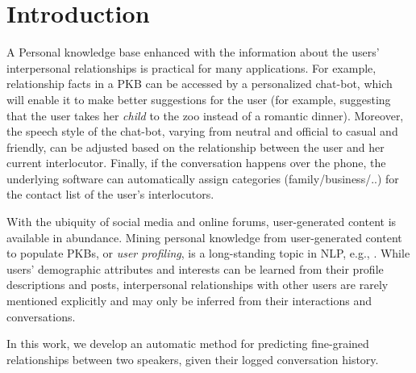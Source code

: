 \section{Introduction}

 A Personal knowledge base enhanced with the information about the users' interpersonal relationships is practical for many applications. For example, relationship facts in a PKB can be accessed by a personalized chat-bot, which will enable it to make better suggestions for the user (for example, suggesting that the user takes her \textit{child} to the zoo instead of a romantic dinner). Moreover, the speech style of the chat-bot, varying from neutral and official to casual and friendly, can be adjusted based on the relationship between the user and her current interlocutor. Finally, if the conversation happens over the phone, the underlying software can automatically assign categories (family/business/..) for the contact list of the user's interlocutors.

With the ubiquity of social media and online forums, user-generated content is available in abundance. Mining personal knowledge from user-generated content to populate PKBs, or \emph{user profiling}, is a long-standing topic in NLP, e.g., \cite{flekova:ACL16:long,basile:2017,tigunova2019listening}. While users' demographic attributes and interests can be learned from their profile descriptions and posts, interpersonal relationships with other users are rarely mentioned explicitly and may only be inferred from their interactions and conversations.

In this work, we develop an automatic method for predicting fine-grained relationships between two speakers, given their logged conversation history.

